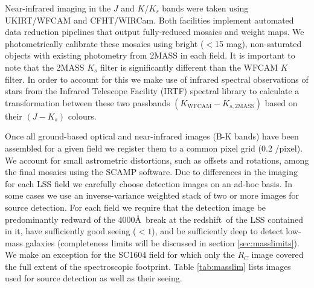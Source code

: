 \documentclass[a4paper,fleqn,usenatbib]{mnras}
\def\z{redshift}
\begin{document}
Near-infrared imaging in the $J$ and $K$/$K_s$ bands were taken using UKIRT/WFCAM and CFHT/WIRCam.
Both facilities implement automated data reduction pipelines that output fully-reduced mosaics and weight maps.
We photometrically calibrate these mosaics using bright ($<$15 mag), non-saturated objects with existing photometry from 2MASS in each field.
It is important to note that the 2MASS $K_s$ filter is significantly different than the WFCAM $K$ filter.
In order to account for this we make use of infrared spectral observations of stars from the Infrared Telescope Facility (IRTF) spectral library \citep{Rayner2009} to calculate a transformation between these two passbands $(K_{\mathrm{WFCAM}} - K_{s, \mathrm{2MASS}})$ based on their $(J - K_s)$ colours.


Once all ground-based optical and near-infrared images (B-K bands) have been assembled for a given field we register them to a common pixel grid (0.2 \arcsec /pixel).
We account for small astrometric distortions, such as offsets and rotations, among the final mosaics using the SCAMP software.
Due to differences in the imaging for each LSS field we carefully choose detection images on an ad-hoc basis.
In some cases we use an inverse-variance weighted stack of two or more images for source detection.
For each field we require that the detection image be predominantly redward of the 4000\AA\ break at the \z\ of the LSS contained in it, have sufficiently good seeing ($<1$\arcsec ), and be sufficiently deep to detect low-mass galaxies (completeness limits will be discussed in section \ref{sec:masslimits}).
We make an exception for the SC1604 field for which only the $R_C$ image covered the full extent of the spectroscopic footprint.
Table \ref{tab:masslim} lists images used for source detection as well as their seeing.
\end{document}
